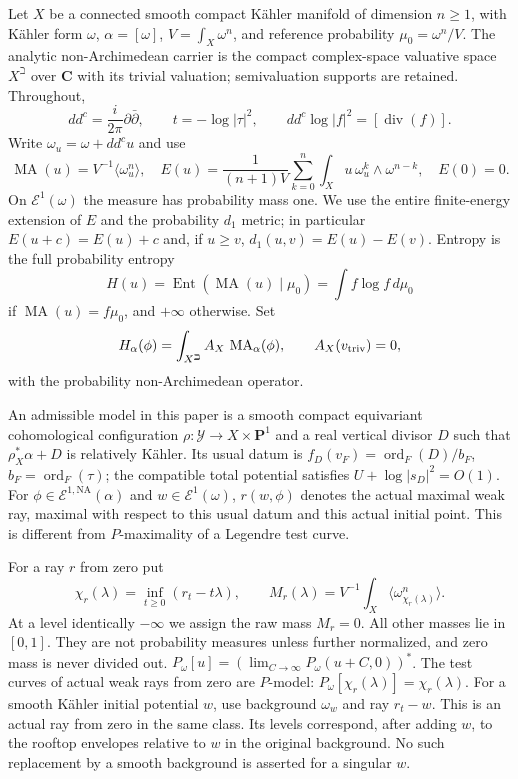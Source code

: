\documentclass[11pt]{article}
\newcommand{\MA}{\operatorname{MA}}
\newcommand{\NA}{\mathrm{NA}}
\newcommand{\Ent}{\operatorname{Ent}}
\newcommand{\ord}{\operatorname{ord}}
\newcommand{\cE}{\mathcal E}
\newcommand{\ddc}{dd^c}
\theoremstyle{remark}\newtheorem{remark}[theorem]{Remark}
\begin{document}
Let $X$ be a connected smooth compact K\"ahler manifold of dimension
$n\geq1$, with K\"ahler form $\omega$, $\alpha=[\omega]$,
$V=\int_X\omega^n$, and reference probability $\mu_0=\omega^n/V$.
The analytic non-Archimedean carrier is the compact complex-space
valuative space $X^\beth$ over $\mathbf C$ with its trivial valuation;
semivaluation supports are retained. Throughout,
\begin{equation}\label{eq:conventions}
 \ddc=\frac{i}{2\pi}\partial\bar\partial,
 \qquad t=-\log|\tau|^2,
 \qquad \ddc\log|f|^2=[\operatorname{div}(f)].
\end{equation}
Write $\omega_u=\omega+\ddc u$ and use
\[
 \MA(u)=V^{-1}\langle\omega_u^n\rangle,
 \quad E(u)=\frac1{(n+1)V}\sum_{k=0}^n
  \int_Xu\,\omega_u^k\wedge\omega^{n-k},\quad E(0)=0.
\]
On $\cE^1(\omega)$ the measure has probability mass one.
We use the entire finite-energy extension of $E$ and the probability
$d_1$ metric; in particular $E(u+c)=E(u)+c$ and, if $u\geq v$,
$d_1(u,v)=E(u)-E(v)$.
Entropy is the full probability entropy
\[
 H(u)=\Ent(\MA(u)\mid\mu_0)=\int f\log f\,d\mu_0
\]
if $\MA(u)=f\mu_0$, and $+\infty$ otherwise. Set
\[
 H_\alpha(\phi)=\int_{X^\beth}A_X\,\MA_\alpha(\phi),
 \qquad A_X(v_{\rm triv})=0,
\]
with the probability non-Archimedean operator.

An admissible model in this paper is a smooth compact equivariant
cohomological configuration $\rho:\mathcal Y\to X\times\mathbf P^1$
and a real vertical divisor $D$ such that
$\rho_X^*\alpha+D$ is relatively K\"ahler. Its usual datum is
$f_D(v_F)=\ord_F(D)/b_F$, $b_F=\ord_F(\tau)$; the compatible
total potential satisfies $U+\log|s_D|^2=O(1)$.
For $\phi\in\cE^{1,\NA}(\alpha)$ and $w\in\cE^1(\omega)$,
$r(w,\phi)$ denotes the actual maximal weak ray, maximal with respect
to this usual datum and this actual initial point.
This is different from $P$-maximality of a Legendre test curve.

For a ray $r$ from zero put
\[
 \chi_r(\lambda)=\inf_{t\geq0}(r_t-t\lambda),\qquad
 M_r(\lambda)=V^{-1}\int_X\langle\omega_{\chi_r(\lambda)}^n\rangle.
\]
At a level identically $-\infty$ we assign the raw mass $M_r=0$.
All other masses lie in $[0,1]$. They are not probability measures
unless further normalized, and zero mass is never divided out.
$P_\omega[u]=(\lim_{C\to\infty}P_\omega(u+C,0))^*$.
The test curves of actual weak rays from zero are $P$-model:
$P_\omega[\chi_r(\lambda)]=\chi_r(\lambda)$.
For a smooth K\"ahler initial potential $w$, use background
$\omega_w$ and ray $r_t-w$. This is an actual ray from zero in the
same class. Its levels correspond, after adding $w$, to the rooftop
envelopes relative to $w$ in the original background. No such
replacement by a smooth background is asserted for a singular $w$.
\end{document}
